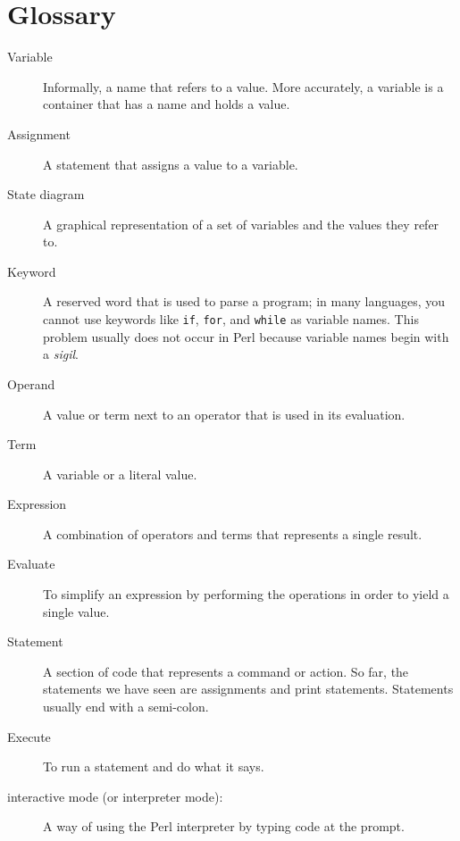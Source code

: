 \section{Glossary}

\begin{description}

\item[Variable]  Informally, a name that refers to a value. More 
accurately, a variable is a container that has a name and holds a value.

\item[Assignment]  A statement that assigns a value to a variable.

\item[State diagram]  A graphical representation of a set of variables and the
values they refer to.

\item[Keyword]  A reserved word that is used to parse a
program; in many languages, you cannot use keywords like 
{\tt if}, {\tt  for}, and {\tt while} as variable names. 
This problem usually does not occur in Perl because variable
names begin with a \emph{sigil}.

\item[Operand] A value or term next to an operator that 
is used in its evaluation.

\item[Term]  A variable or a literal value.

\item[Expression]  A combination of operators and terms that
represents a single result.

\item[Evaluate]  To simplify an expression by performing the operations
in order to yield a single value.

\item[Statement]  A section of code that represents a command or action.  So
far, the statements we have seen are assignments and print statements. Statements usually end with a semi-colon.

\item[Execute]  To run a statement and do what it says.

\item[interactive mode (or interpreter mode):] A way of using the Perl 
interpreter by typing code at the prompt.


\end{description}
